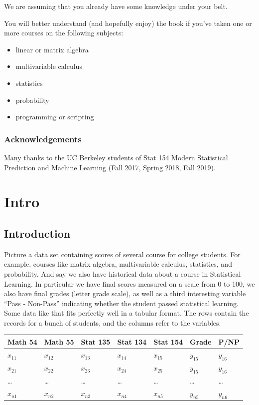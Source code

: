 \documentclass[]{book}
\providecommand{\tightlist}{%
  \setlength{\itemsep}{0pt}\setlength{\parskip}{0pt}}
\begin{document}
We are assuming that you already have some knowledge under your belt.

You will better understand (and hopefully enjoy) the book if you've taken one
or more courses on the following subjects:

\begin{itemize}
\tightlist
\item
  linear or matrix algebra
\item
  multivariable calculus
\item
  statistics
\item
  probability
\item
  programming or scripting
\end{itemize}

\hypertarget{acknowledgements}{%
\section{Acknowledgements}\label{acknowledgements}}

Many thanks to the UC Berkeley students of Stat 154 Modern Statistical Prediction
and Machine Learning (Fall 2017, Spring 2018, Fall 2019).

\hypertarget{part-intro}{%
\part{Intro}\label{part-intro}}

\hypertarget{intro}{%
\chapter{Introduction}\label{intro}}

Picture a data set containing scores of several course for college students.
For example, courses like matrix algebra, multivariable calculus,
statistics, and probability. And say we also have historical data about a course in Statistical
Learning. In particular we have final scores measured on a scale from 0 to 100,
we also have final grades (letter grade scale), as well as a third interesting
variable ``Pass - Non-Pass'' indicating whether the student passed statistical learning.
Some data like that fits perfectly well in a tabular format. The rows contain
the records for a bunch of students, and the columns refer to the variables.

\begin{longtable}[]{@{}lllllll@{}}
\toprule
Math 54 & Math 55 & Stat 135 & Stat 134 & Stat 154 & Grade & P/NP\tabularnewline
\midrule
\endhead
\(x_{11}\) & \(x_{12}\) & \(x_{13}\) & \(x_{14}\) & \(x_{15}\) & \(y_{15}\) & \(y_{16}\)\tabularnewline
\(x_{21}\) & \(x_{22}\) & \(x_{23}\) & \(x_{24}\) & \(x_{25}\) & \(y_{15}\) & \(y_{16}\)\tabularnewline
\ldots{} & \ldots{} & \ldots{} & \ldots{} & \ldots{} & \ldots{} & \ldots{}\tabularnewline
\(x_{n1}\) & \(x_{n2}\) & \(x_{n3}\) & \(x_{n4}\) & \(x_{n5}\) & \(y_{n5}\) & \(y_{n6}\)\tabularnewline
\bottomrule
\end{longtable}
\end{document}

